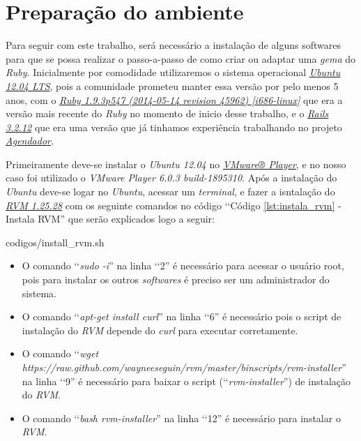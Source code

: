\section{Preparação do ambiente}
\label{section:preparação_do_ambiente}

Para seguir com este trabalho, será necessário a instalação de alguns softwares para que se possa realizar
o passo-a-passo de como criar ou adaptar uma \emph{gema} do \emph{Ruby}.
Inicialmente por comodidade utilizaremos o sistema operacional 
\emph{\href{http://releases.ubuntu.com/12.04/}{Ubuntu 12.04 LTS}}, pois a comunidade prometeu manter essa 
versão por pelo menos 5 anos, com o 
\emph{\href{https://www.ruby-lang.org/en/downloads/}{Ruby 1.9.3p547 (2014-05-14 revision 45962) [i686-linux]}} 
que era a versão mais recente do \emph{Ruby} no momento de inicio desse trabalho, e o 
\emph{\href{http://rubyonrails.org/download/}{Rails 3.2.12}} que era uma versão que já tinhamos experiência
trabalhando no projeto \emph{\href{http://agendador.c3sl.ufpr.br/}{Agendador}}.

Primeiramente deve-se instalar o \emph{Ubuntu 12.04} no 
\emph{\href{https://my.vmware.com/web/vmware/free\#desktop_end_user_computing/vmware_player/}{VMware® Player}}, 
e no nosso caso foi utilizado o \emph{VMware Player 6.0.3 build-1895310}. Após a instalação do \emph{Ubuntu}
deve-se logar no \emph{Ubuntu}, acessar um \emph{terminal}, e fazer a isntalação do 
\emph{\href{https://github.com/wayneeseguin/rvm}{RVM 1.25.28}} com os seguinte comandos no código 
‘‘Código \ref{lst:instala_rvm} - Instala RVM'' que serão explicados logo a seguir:
 
 
 {codigos/install_rvm.sh}
 
\begin{itemize}

\item O comando ‘‘\emph{sudo -i}'' na linha ‘‘2'' é necessário para acessar o usuário root, pois 
  para instalar os outros \emph{softwares} é preciso ser um administrador do sistema.
  
  \item O comando ‘‘\emph{apt-get install curl}'' na linha ‘‘6'' é necessário pois o script de 
  instalação do \emph{RVM} depende do \emph{curl} para executar corretamente.
  
  \item O comando ‘‘\emph{wget https://raw.github.com/wayneeseguin/rvm/master/binscripts/rvm-installer}'' 
  na linha ‘‘9'' é necessário para baixar o script (‘‘\emph{rvm-installer}'') de instalação do \emph{RVM}.
  
  \item O comando ‘‘\emph{bash rvm-installer}'' na linha ‘‘12'' é necessário para instalar o \emph{RVM}.
  
\end{itemize}


